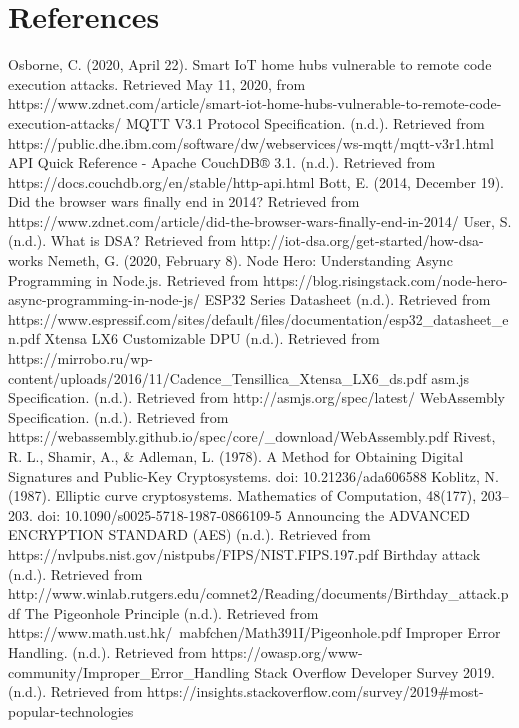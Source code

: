 \documentclass{article}
\begin{document}
\section{References}
\begin{thebibliography}{9}
Osborne, C. (2020, April 22). Smart IoT home hubs vulnerable to remote code execution attacks. Retrieved May 11, 2020, from https://www.zdnet.com/article/smart-iot-home-hubs-vulnerable-to-remote-code-execution-attacks/
MQTT V3.1 Protocol Specification. (n.d.). Retrieved from https://public.dhe.ibm.com/software/dw/webservices/ws-mqtt/mqtt-v3r1.html
API Quick Reference - Apache CouchDB® 3.1. (n.d.). Retrieved from https://docs.couchdb.org/en/stable/http-api.html
Bott, E. (2014, December 19). Did the browser wars finally end in 2014? Retrieved from https://www.zdnet.com/article/did-the-browser-wars-finally-end-in-2014/
User, S. (n.d.). What is DSA? Retrieved from http://iot-dsa.org/get-started/how-dsa-works
Nemeth, G. (2020, February 8). Node Hero: Understanding Async Programming in Node.js. Retrieved from https://blog.risingstack.com/node-hero-async-programming-in-node-js/
ESP32 Series Datasheet (n.d.). Retrieved from https://www.espressif.com/sites/default/files/documentation/esp32\_datasheet\_en.pdf
Xtensa LX6 Customizable DPU (n.d.). Retrieved from https://mirrobo.ru/wp-content/uploads/2016/11/Cadence\_Tensillica\_Xtensa\_LX6\_ds.pdf
asm.js Specification. (n.d.). Retrieved from http://asmjs.org/spec/latest/
	WebAssembly Specification. (n.d.). Retrieved from https://webassembly.github.io/spec/core/\_download/WebAssembly.pdf
Rivest, R. L., Shamir, A., \& Adleman, L. (1978). A Method for Obtaining Digital Signatures and Public-Key Cryptosystems. doi: 10.21236/ada606588
Koblitz, N. (1987). Elliptic curve cryptosystems. Mathematics of Computation, 48(177), 203–203. doi: 10.1090/s0025-5718-1987-0866109-5
Announcing the ADVANCED ENCRYPTION STANDARD (AES)  (n.d.). Retrieved from https://nvlpubs.nist.gov/nistpubs/FIPS/NIST.FIPS.197.pdf
Birthday attack (n.d.). Retrieved from http://www.winlab.rutgers.edu/comnet2/Reading/documents/Birthday\_attack.pdf
The Pigeonhole Principle (n.d.). Retrieved from https://www.math.ust.hk/~mabfchen/Math391I/Pigeonhole.pdf
Improper Error Handling. (n.d.). Retrieved from https://owasp.org/www-community/Improper\_Error\_Handling
Stack Overflow Developer Survey 2019. (n.d.). Retrieved from https://insights.stackoverflow.com/survey/2019\#most-popular-technologies
\end{thebibliography}
\end{document}
